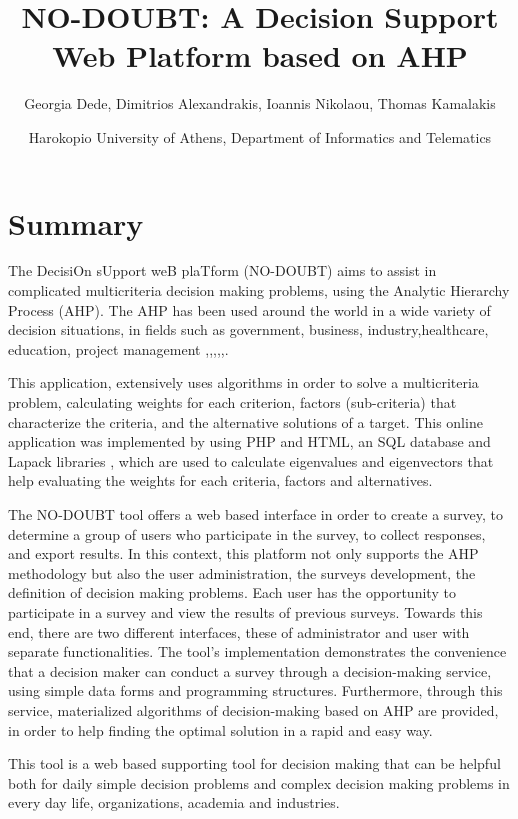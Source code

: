 \documentclass{article}
\title{NO-DOUBT: A Decision Support Web Platform based on AHP}
\author{Georgia Dede, Dimitrios Alexandrakis, Ioannis Nikolaou, Thomas Kamalakis}
\date{Harokopio University of Athens, Department of Informatics and Telematics}
\begin{document}
\maketitle



\section*{Summary}
The DecisiOn sUpport weB plaTform (NO-DOUBT) aims to assist in complicated multicriteria decision making problems, using the Analytic Hierarchy Process (AHP). The AHP has been used around the world in a wide variety of decision situations, in fields such as government, business, industry,healthcare, education, project management \citep{chan2006ahp},\citep{dede2010evaluation},\citep{drake1998using},\citep{lee2006investigating},\citep{liberatore2008analytic},\citep{saaty2003decision}.

This application, extensively uses algorithms in order to solve a multicriteria problem, calculating weights for each criterion, factors (sub-criteria) that characterize the criteria, and the alternative solutions of a target. This online application was implemented by using PHP and HTML, an SQL database and Lapack libraries \citep{Lapack}, which are used to calculate eigenvalues and eigenvectors that help evaluating the weights for each criteria, factors and alternatives.

The NO-DOUBT tool offers a web based interface in order to create a survey, to determine a group of users who participate in the survey, to collect responses, and export results. In this context, this platform not only supports the AHP methodology but also the user administration, the surveys development, the definition of decision making problems. Each user has the opportunity to participate in a survey and view the results of previous surveys. Towards this end, there are two different interfaces, these of administrator and user with separate functionalities. The tool's implementation demonstrates the convenience that a decision maker can conduct a survey through a decision-making service, using simple data forms and programming structures. Furthermore, through this service, materialized algorithms of decision-making based on AHP are provided, in order to help finding the optimal solution in a rapid and easy way.

This tool is a web based supporting tool for decision making that can be helpful both for daily simple
decision problems and complex decision making problems in every day life, organizations, academia and industries.
\end{document}
